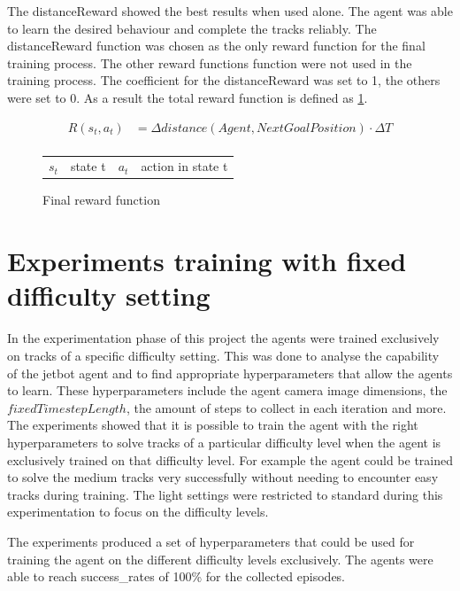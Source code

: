 The distanceReward showed the best results when used alone. The agent was able to learn the desired behaviour and complete the tracks reliably. The distanceReward function was chosen as the only reward function for the final training process. The other reward functions function were not used in the training process.
The coefficient for the distanceReward was set to 1, the others were set to 0. As a result the total reward function is defined as \ref{fig:final_reward_function}.

\begin{figure}
    \centering
    \begin{align*}
        R(s_t,a_t) & = \Delta distance(Agent, NextGoalPosition) \cdot \Delta T \nonumber \\
    \end{align*}
    \caption{Final reward function}
    \begin{tabular}{r@{: }l r@{: }l}
        $s_t$ & state t & $a_t$ & action in state t
    \end{tabular}
    \label{fig:final_reward_function}
\end{figure}


\section{Experiments training with fixed difficulty setting}
\label{cha:experiment_fixed_difficulty}

In the experimentation phase of this project the agents were trained exclusively on tracks of a specific difficulty setting. This was done to analyse the capability of the jetbot agent and to find appropriate hyperparameters that allow the agents to learn. These hyperparameters include the agent camera image dimensions, the $fixedTimestepLength$, the amount of steps to collect in each iteration and more.
The experiments showed that it is possible to train the agent with the right hyperparameters to solve tracks of a particular difficulty level when the agent is exclusively trained on that difficulty level. For example the agent could be trained to solve the medium tracks very successfully without needing to encounter easy tracks during training. The light settings were restricted to standard during this experimentation to focus on the difficulty levels.

The experiments produced a set of hyperparameters that could be used for training the agent on the different difficulty levels exclusively. The agents were able to reach success\_rates of 100\% for the collected episodes.


